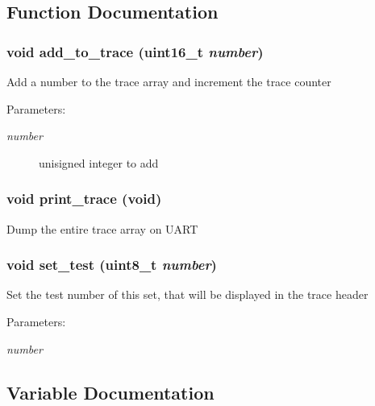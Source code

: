 \subsection{Function Documentation}
\subsubsection{\setlength{\rightskip}{0pt plus 5cm}void add\_\-to\_\-trace (uint16\_\-t {\em number})}\label{trace_8c_fb273c7463f897628ae56507128a23f0}


Add a number to the trace array and increment the trace counter

\begin{Desc}
\item[Parameters:]
\begin{description}
\item[{\em number}]unisigned integer to add \end{description}
\end{Desc}
\subsubsection{\setlength{\rightskip}{0pt plus 5cm}void print\_\-trace (void)}\label{trace_8c_6ff3858889fb6c93d595f9500a7eb232}


Dump the entire trace array on UART 
\subsubsection{\setlength{\rightskip}{0pt plus 5cm}void set\_\-test (uint8\_\-t {\em number})}\label{trace_8c_979fdf811bf4b4501b9b9a7e90e2181c}


Set the test number of this set, that will be displayed in the trace header

\begin{Desc}
\item[Parameters:]
\begin{description}
\item[{\em number}]\end{description}
\end{Desc}


\subsection{Variable Documentation}

